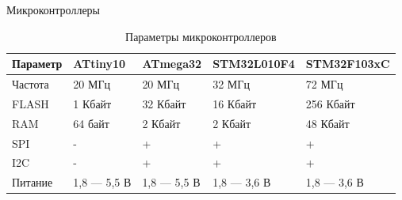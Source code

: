 \documentclass[10pt]{beamer}
\begin{document}
%	
%
%	
%
%	
%		

\begin{frame}{Микроконтроллеры}
\begin{small}
\begin{table}[H]
\caption{Параметры микроконтроллеров}
\begin{tabular}{|p{1.5 cm}|p{1.9 cm}|p{1.9 cm}|p{1.9 cm}|p{1.9 cm}|}
\hline
        Параметр & ATtiny10 & ATmega32 & STM32L010F4 & STM32F103xC \\ \hline
        Частота & 20 МГц & 20 МГц & 32 МГц & 72 МГц \\ \hline
        FLASH & 1 Кбайт & 32 Кбайт & 16 Кбайт & 256 Кбайт \\ \hline
        RAM & 64 байт & 2 Кбайт & 2 Кбайт & 48 Кбайт \\ \hline
        SPI & - & + & + & + \\ \hline
        I2C & - & +	 & + & + \\ \hline
        Питание & 1,8 --- 5,5 В & 1,8 --- 5,5 В & 1,8 --- 3,6 В & 1,8 --- 3,6 В \\ \hline
\end{tabular}
\end{table}
\end{small}
\end{frame}
\end{document}
